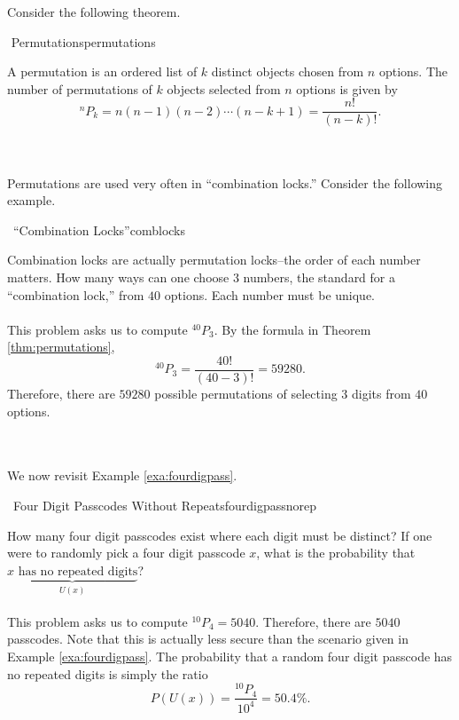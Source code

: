         Consider the following theorem.
        \begin{theorem}{\Stop\,\,Permutations}{permutations}

            A permutation is an ordered list of \(k\) distinct objects chosen from \(n\) options. The number of permutations of \(k\) objects selected from \(n\) options is given by
            \begin{equation*}
                ^nP_k=n(n-1)(n-2)\cdots(n-k+1)=\frac{n!}{(n-k)!}.
            \end{equation*}
            
        \end{theorem}
        \vphantom
        \\
        \\
        Permutations are used very often in ``combination locks.'' Consider the following example.
        \begin{example}{\Difficulty\,\Difficulty\,\,``Combination Locks''}{comblocks}

            Combination locks are actually permutation locks--the order of each number matters. How many ways can one choose \(3\) numbers, the standard for a ``combination lock,'' from \(40\) options. Each number must be unique.
            \\
            \\
            This problem asks us to compute \(^{40}P_3\). By the formula in Theorem \ref{thm:permutations},
            \begin{equation*}
                ^{40}P_3=\frac{40!}{(40-3)!}=59280.
            \end{equation*}
            Therefore, there are \(59280\) possible permutations of selecting \(3\) digits from \(40\) options.

        \end{example}
        \pagebreak
        \vphantom
        \\
        \\
        We now revisit Example \ref{exa:fourdigpass}.
        \begin{example}{\Difficulty\,\Difficulty\,\,Four Digit Passcodes Without Repeats}{fourdigpassnorep}

            How many four digit passcodes exist where each digit must be distinct? If one were to randomly pick a four digit passcode \(x\), what is the probability that \(\underbrace{x\text{ has no repeated digits}}_{U(x)}\)?
            \\
            \\
            This problem asks us to compute \(^{10}P_4=5040\). Therefore, there are \(5040\) passcodes. Note that this is actually less secure than the scenario given in Example \ref{exa:fourdigpass}. The probability that a random four digit passcode has no repeated digits is simply the ratio
            \begin{equation*}
                P(U(x))=\frac{^{10}P_4}{10^4}=50.4\%.
            \end{equation*}

        \end{example}

